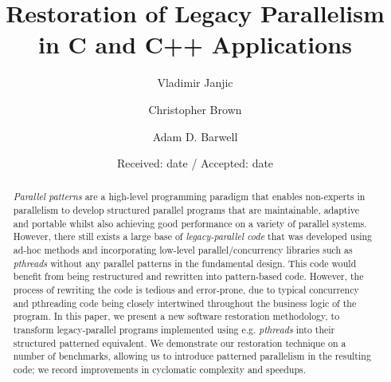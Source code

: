 \documentclass[smallextended]{svjour3}
\begin{document}
\title{Restoration of Legacy Parallelism in C and C++ Applications}
%
%
\author{Vladimir Janjic         \and
	Christopher Brown \and 
	Adam D. Barwell \and
}



\date{Received: date / Accepted: date}

\maketitle
%
\begin{abstract}
    \emph{Parallel patterns} are a high-level programming paradigm that enables non-experts in parallelism to develop structured parallel programs that are maintainable, adaptive and portable whilst also achieving good performance on a variety of parallel systems. However, there still exists a large base of \emph{legacy-parallel code} that was developed using ad-hoc methods and incorporating low-level parallel/concurrency libraries such as \emph{pthreads} without any parallel patterns in the fundamental design. This code would benefit from being restructured and rewritten into pattern-based code. However, the process of rewriting the code is tedious and error-prone, due to typical concurrency and pthreading code being closely intertwined throughout the business logic of the program. In this paper, we present a new software restoration methodology, to transform legacy-parallel programs implemented using e.g. \emph{pthreads} into their structured patterned equivalent. We demonstrate our restoration technique on a number of benchmarks, allowing us to introduce patterned parallelism in the resulting code; we record improvements in cyclomatic complexity and speedups.

\end{abstract}

%
%




\end{document}
